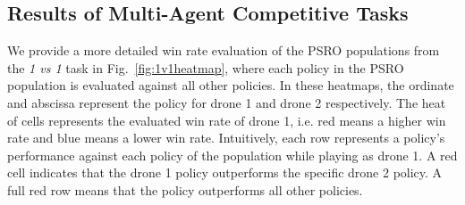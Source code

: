 


\subsection{Results of Multi-Agent Competitive Tasks}
\label{app:mix}
We provide a more detailed win rate evaluation of the PSRO populations from the \textit{1 vs 1} task in Fig.~\ref{fig:1v1heatmap}, where each policy in the PSRO population is evaluated against all other policies. In these heatmaps, the ordinate and abscissa represent the policy for drone 1 and drone 2 respectively. The heat of cells represents the evaluated win rate of drone 1, i.e. red means a higher win rate and blue means a lower win rate. Intuitively, each row represents a policy's performance against each policy of the population while playing as drone 1. A red cell indicates that the drone 1 policy outperforms the specific drone 2 policy. A full red row means that the policy outperforms all other policies.


